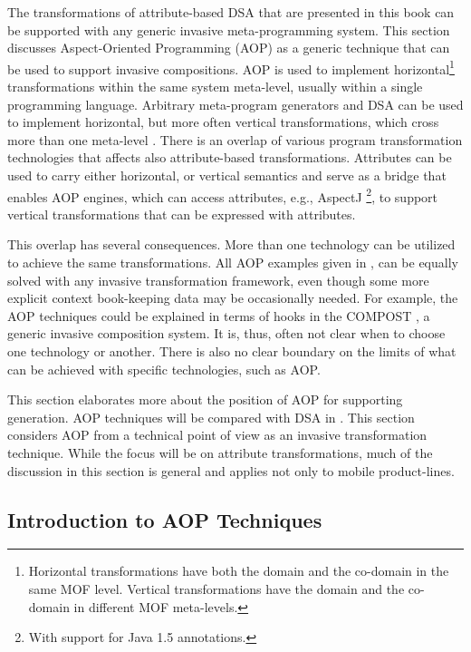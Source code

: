 The transformations of attribute-based DSA  that are presented in this book can be supported with any generic invasive meta-programming system. This section discusses Aspect-Oriented Programming (AOP) \cite{kiczalesetal.97} as a generic technique that can be used to support invasive compositions. AOP is used to implement horizontal\footnote{Horizontal transformations have both the domain and the co-domain in the same MOF \cite{www.mof} level. Vertical transformations have the domain and the co-domain in different MOF meta-levels.} transformations \cite{sf.04} within the same system meta-level, usually within a single programming language. Arbitrary meta-program generators and DSA can be used to implement horizontal, but more often vertical transformations, which cross more than one meta-level . There is an overlap of various program transformation technologies that affects also attribute-based transformations. Attributes can be used to carry either horizontal, or vertical  semantics and serve as a bridge that enables AOP engines, which can access attributes, e.g., AspectJ \cite{Laddad.aop, www.aspectjt}\footnote{With support for Java 1.5 annotations.}, to support vertical transformations that can be expressed with attributes. 

This overlap has several consequences. More than one technology can be utilized to achieve the same transformations. All AOP examples given in \cite{Laddad.aop}, can be equally solved with any invasive transformation framework, even though some more explicit context book-keeping data may be occasionally needed. For example, the AOP techniques could be explained in terms of hooks in the COMPOST \cite{java.compost}, a generic invasive composition system. It is, thus, often not clear when to choose one technology or another. There is also no clear boundary on the limits of what can be achieved with specific technologies, such as AOP.

This section elaborates more about the position of AOP for supporting generation. AOP techniques will be compared with DSA in . This section considers AOP from a technical point of view as an invasive transformation technique. While the focus will be on attribute transformations, much of the discussion in this section is general and applies not only to mobile product-lines.

\subsection{Introduction to AOP Techniques}
\label{sec:aop-intro}

